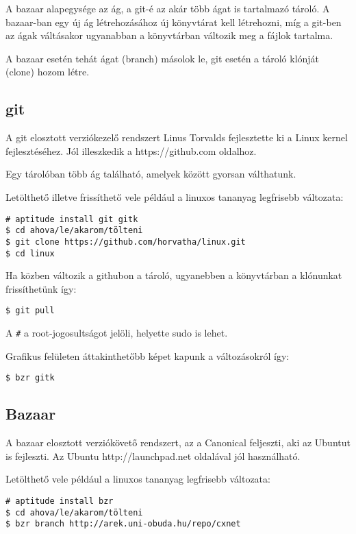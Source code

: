 \documentclass[a4paper]{article}
\begin{document}
A bazaar alapegysége az ág, a git-é az akár több ágat is
tartalmazó tároló. A bazaar-ban egy új ág létrehozásához új könyvtárat
kell létrehozni, míg a git-ben az ágak váltásakor ugyanabban a
könyvtárban változik meg a fájlok tartalma.

A bazaar esetén tehát ágat (branch) másolok le, git esetén a tároló
klónját (clone) hozom létre.


\subsection{git}
A git elosztott verziókezelő rendszert Linus Torvalds fejlesztette ki a
Linux kernel fejlesztéséhez. Jól illeszkedik a https://github.com
oldalhoz.

Egy tárolóban több ág található, amelyek között gyorsan
válthatunk.

Letölthető illetve frissíthető vele például a linuxos tananyag
legfrisebb változata:

\begin{Verbatim}
# aptitude install git gitk
$ cd ahova/le/akarom/tölteni
$ git clone https://github.com/horvatha/linux.git
$ cd linux
\end{Verbatim}

Ha közben változik a githubon a tároló, ugyanebben a könyvtárban a
klónunkat frissíthetünk így:

\begin{Verbatim}
$ git pull
\end{Verbatim}

A \verb"#" a root-jogosultságot jelöli, helyette sudo is lehet.

Grafikus felületen áttakinthetőbb képet kapunk a változásokról így:
\begin{Verbatim}
$ bzr gitk
\end{Verbatim}

\subsection{Bazaar}
\label{seq:bazaar}
A bazaar elosztott verziókövető rendszert, az a Canonical feljeszti, aki
az Ubuntut is fejleszti. Az Ubuntu http://launchpad.net oldalával jól használható.

Letölthető vele például a linuxos tananyag legfrisebb változata:

\begin{Verbatim}
# aptitude install bzr
$ cd ahova/le/akarom/tölteni
$ bzr branch http://arek.uni-obuda.hu/repo/cxnet
\end{Verbatim}
\end{document}
